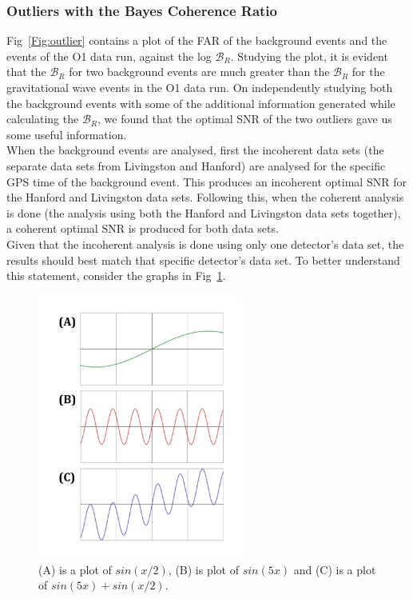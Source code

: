 \documentclass{article}
\begin{document}
 
 
 
 \subsubsection{Outliers with the Bayes Coherence Ratio}
 
 
  
  Fig~\ref{Fig:outlier} contains a plot of the FAR of the background events and the events of the O1 data run, against the log  $\mathcal{B}_{R}$. Studying the plot, it is evident that the $\mathcal{B}_{R}$ for two background events are much greater than the $\mathcal{B}_{R}$ for the gravitational wave events in the O1 data run.  On independently studying both the background events with some of the additional information generated while calculating the $\mathcal{B}_{R}$, we found that the optimal SNR of the two outliers gave us some useful information.\\
 
When the background events are analysed, first the incoherent data sets (the separate data sets from Livingston and Hanford) are analysed for the specific GPS time of the background event. This produces an incoherent optimal SNR for the Hanford and Livingston data sets. Following this, when the coherent analysis is done (the analysis using both the Hanford and Livingston data sets together), a coherent optimal SNR is produced for both data sets. \\


Given that the incoherent analysis is done using only one detector's data set, the results should best match that specific detector's data set. To better understand this statement, consider the graphs in Fig~\ref{Fig:trigGraphs}.


\begin{figure}[h]
	\centering
	\includegraphics[width=0.6\textwidth]{Figures/Graphs.pdf} 
	\caption{(A) is a plot of $sin(x/2)$, (B) is plot of $sin(5x)$ and (C) is a plot of $sin(5x)+sin(x/2)$. }
	\label{Fig:trigGraphs}
\end{figure}
\end{document}
